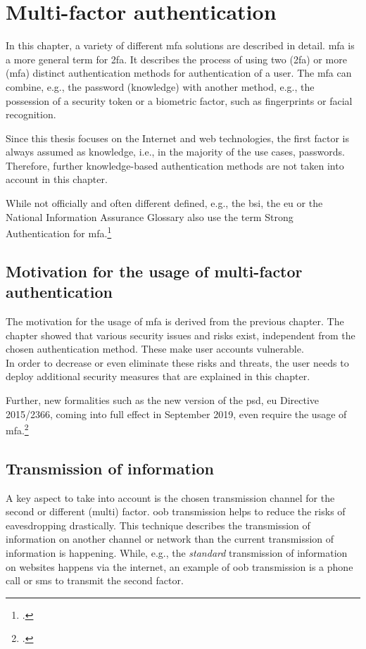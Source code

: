 \chapter{Multi-factor authentication}

In this chapter, a variety of different \gls{mfa} solutions are described in detail. \Gls{mfa} is a more general term for \gls{2fa}. It describes the process of using two (\gls{2fa}) or more (\gls{mfa}) distinct authentication methods for authentication of a user. The \gls{mfa} can combine, e.g., the password (knowledge) with another method, e.g., the possession of a security token or a biometric factor, such as fingerprints or facial recognition.

Since this thesis focuses on the Internet and web technologies, the first factor is always assumed as knowledge, i.e., in the majority of the use cases, passwords. Therefore, further knowledge-based authentication methods are not taken into account in this chapter.

While not officially and often different defined, e.g., the \gls{bsi}, the \gls{eu} or the National Information Assurance Glossary also use the term Strong Authentication for \gls{mfa}.\footcites[See][47]{CNSS4009}[See][11]{deutschland2018grundschutz}

\section{Motivation for the usage of multi-factor authentication}

The motivation for the usage of \gls{mfa} is derived from the previous chapter. The chapter showed that various security issues and risks exist, independent from the chosen authentication method. These make user accounts vulnerable.\\
 In order to decrease or even eliminate these risks and threats, the user needs to deploy additional security measures that are explained in this chapter.
 
 Further, new formalities such as the new version of the \gls{psd}, \gls{eu} Directive 2015/2366, coming into full effect in September 2019, even require the usage of \gls{mfa}.\footcites[See][10]{NOCTOR20189}

\newpage

\section{Transmission of information}

A key aspect to take into account is the chosen transmission channel for the second or different (multi) factor. \gls{oob} transmission helps to reduce the risks of eavesdropping drastically. This technique describes the transmission of information on another channel or network than the current transmission of information is happening. While, e.g., the \textit{standard} transmission of information on websites happens via the internet, an example of \gls{oob} transmission is a phone call or \gls{sms} to transmit the second factor.